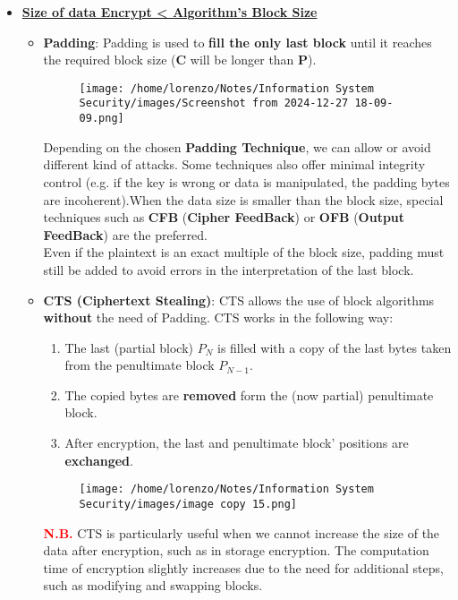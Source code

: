 \begin{itemize}
    
\item \underline{\textbf{Size of data Encrypt < Algorithm's Block Size}} 
\begin{itemize}
    \item \textbf{Padding}: Padding is used to \textbf{fill the only last block} until it reaches the required block size (\textbf{C} will be longer than \textbf{P}).
    \begin{figure}[H]
        \centering
        \texttt{[image: /home/lorenzo/Notes/Information System Security/images/Screenshot from 2024-12-27 18-09-09.png]}
    \end{figure}
    Depending on the chosen \textbf{Padding Technique}, we can allow or avoid different kind of attacks. Some techniques also offer minimal integrity control (e.g. if the key is wrong or data is manipulated, the padding bytes are incoherent).When the data size is smaller than the block size, special techniques such as \textbf{CFB} (\textbf{Cipher FeedBack}) or \textbf{OFB} (\textbf{Output FeedBack}) are the preferred.\\
    Even if the plaintext is an exact multiple of the block size, padding must still be added to avoid errors in the interpretation of the last block. 
    \vspace{0.1cm}
    \item \textbf{CTS (Ciphertext Stealing)}: CTS allows the use of block algorithms \textbf{without} the need of Padding. CTS works in the following way:
    \begin{enumerate}
        \item The last (partial block) \(P_N\) is filled with a copy of the last bytes taken from the penultimate block \(P_{N-1}\).
        \item The copied bytes are \textbf{removed} form the (now partial) penultimate block.
        \item After encryption, the last and penultimate block' positions are \textbf{exchanged}.
    \end{enumerate}
    \begin{figure}[H]
        \centering
        \texttt{[image: /home/lorenzo/Notes/Information System Security/images/image copy 15.png]}   
    \end{figure}
    \textcolor{red}{\textbf{N.B.}} CTS is particularly useful when we cannot increase the size of the data after encryption, such as in storage encryption. The computation time of encryption slightly increases due to the need for additional steps, such as modifying and swapping blocks.

\end{itemize}
\end{itemize}
